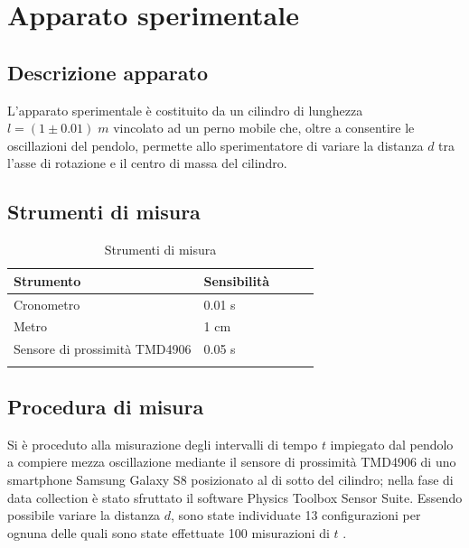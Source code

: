 \documentclass[11pt,a4paper]{article}
\begin{document}
\section{Apparato sperimentale}

\subsection{Descrizione apparato}
L'apparato sperimentale è costituito da un cilindro di lunghezza $l = (1 \pm 0.01) \; m$ vincolato ad un perno mobile che, oltre a consentire le oscillazioni del pendolo, permette allo sperimentatore di variare la distanza $d$ tra l'asse di rotazione e il centro di massa del cilindro.

\subsection{Strumenti di misura}

\begin{longtable}[]{@{}lllll@{}}
    \toprule
    Strumento & Sensibilità \tabularnewline
    \midrule
    \endhead
    Cronometro & 0.01 \; s \tabularnewline
    Metro & 1 \; cm \tabularnewline
    Sensore di prossimità TMD4906 & 0.05 \; s \tabularnewline
    \bottomrule
    \caption{Strumenti di misura}
    \label{tab:tool}
\end{longtable}


\subsection{Procedura di misura}
Si è proceduto alla misurazione degli intervalli di tempo $t$ impiegato dal pendolo a compiere mezza oscillazione mediante il sensore di prossimità TMD4906 di uno smartphone Samsung Galaxy S8 posizionato al di sotto del cilindro; nella fase di data collection è stato sfruttato il software Physics Toolbox Sensor Suite. 
Essendo possibile variare la distanza $d$, sono state individuate 13 configurazioni per ognuna delle quali sono state effettuate 100 misurazioni di $t$ .
\end{document}

